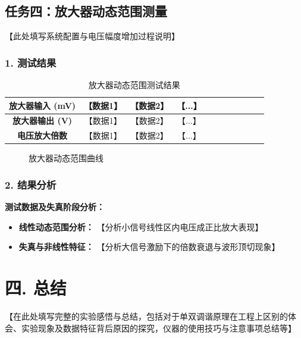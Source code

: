 \documentclass[12pt]{article}
\begin{document}
\subsection*{任务四：放大器动态范围测量}

【此处填写系统配置与电压幅度增加过程说明】

\subsubsection*{1. 测试结果}

\begin{table}[H]
\centering
\begin{tabular}{c*{10}{c}}
\toprule
放大器输入 (mV) & 【数据1】 & 【数据2】 & 【...】 \\
\midrule
\textbf{放大器输出 (V)} & 【数据1】 & 【数据2】 & 【...】 \\
\textbf{电压放大倍数} & 【数据1】 & 【数据2】 & 【...】 \\
\bottomrule
\end{tabular}
\caption{放大器动态范围测试结果}
\end{table}

 \begin{figure}[htbp]
 \centering
 \caption{放大器动态范围曲线}
 \end{figure}

\subsubsection*{2. 结果分析}

\textbf{测试数据及失真阶段分析：}
\begin{itemize}
    \item \textbf{线性动态范围分析：} 【分析小信号线性区内电压成正比放大表现】
    \item \textbf{失真与非线性特征：} 【分析大信号激励下的倍数衰退与波形顶切现象】
\end{itemize}

\section*{四. 总结}

【在此处填写完整的实验感悟与总结，包括对于单双调谐原理在工程上区别的体会、实验现象及数据特征背后原因的探究，仪器的使用技巧与注意事项总结等】
\end{document}
